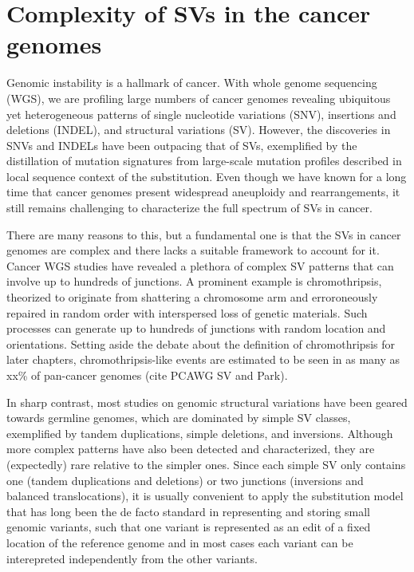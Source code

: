 \documentclass[phd,tocprelim]{cornell}
\begin{document}
\section{Complexity of SVs in the cancer genomes}
Genomic instability is a hallmark of cancer. With whole genome sequencing (WGS), we are profiling large numbers of cancer genomes revealing ubiquitous yet heterogeneous patterns of single nucleotide variations (SNV), insertions and deletions (INDEL), and structural variations (SV). However, the discoveries in SNVs and INDELs have been outpacing that of SVs, exemplified by the distillation of mutation signatures from large-scale mutation profiles described in local sequence context of the substitution. Even though we have known for a long time that cancer genomes present widespread aneuploidy and rearrangements, it still remains challenging to characterize the full spectrum of SVs in cancer.

There are many reasons to this, but a fundamental one is that the SVs in cancer genomes are complex and there lacks a suitable framework to account for it. Cancer WGS studies have revealed a plethora of complex SV patterns that can involve up to hundreds of junctions. A prominent example is chromothripsis, theorized to originate from  shattering a chromosome arm and erroroneously repaired in random order with interspersed loss of genetic materials. Such processes can generate up to hundreds of junctions with random location and orientations. Setting aside the debate about the definition of chromothripsis for later chapters, chromothripsis-like events are estimated to be seen in as many as xx\% of pan-cancer genomes (cite PCAWG SV and Park).

In sharp contrast, most studies on genomic structural variations have been geared towards germline genomes, which are dominated by simple SV classes, exemplified by tandem duplications, simple deletions, and inversions. Although more complex patterns have also been detected and characterized, they are (expectedly) rare relative to the simpler ones. Since each simple SV only contains one (tandem duplications and deletions) or two junctions (inversions and balanced translocations), it is usually convenient to apply the substitution model that has long been the de facto standard in representing and storing small genomic variants, such that one variant is represented as an edit of a fixed location of the reference genome and in most cases each variant can be interepreted independently from the other variants.
\end{document}
